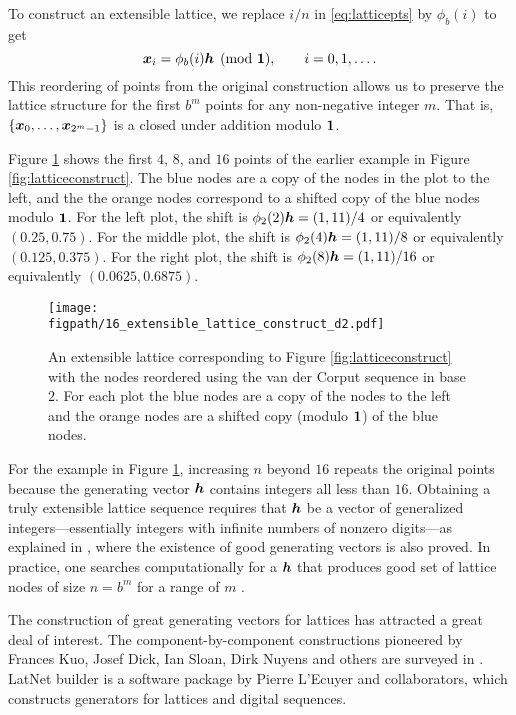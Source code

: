 \documentclass{svproc}
\newcommand{\figpath}{Figures}
\begin{document}
To construct an extensible lattice, we replace $i/n$ in \eqref{eq:latticepts} by $\phi_b(i)$ to get
\begin{equation} \label{eq:extensiblelattice}
	{\boldsymbol{x}}_i =\phi_b( i){\boldsymbol{h}} \pmod {{\boldsymbol{1}}}, \qquad i = 0, 1 , \ldots.
\end{equation}
This reordering of points from the original construction allows us to preserve the lattice structure for the first $b^m$ points for any non-negative integer $m$. That is, $\{{\boldsymbol{x}}_0, \ldots, {\boldsymbol{x}}_{2^m-1}\}$ is a closed under addition modulo ${\boldsymbol{1}}$.

Figure \ref{fig:extensiblelatticeconstruct} shows the first $4$, $8$, and $16$ points of the earlier example in Figure \ref{fig:latticeconstruct}.  The blue nodes are a copy of the nodes in the plot to the left, and the the orange nodes correspond to a shifted copy of the blue nodes modulo ${\boldsymbol{1}}$.  For the left plot, the shift is $\phi_2(2){\boldsymbol{h}} = (1,11)/4$ or equivalently $(0.25,0.75)$.  For the middle plot, the shift is $\phi_2(4){\boldsymbol{h}} = (1,11)/8$ or equivalently $(0.125,0.375)$. For the right plot, the shift is $\phi_2(8){\boldsymbol{h}} = (1,11)/16$  or equivalently $(0.0625,0.6875)$.

\begin{figure}
	\centering
	\texttt{[image: \\figpath/16\_extensible\_lattice\_construct\_d2.pdf]}
	\caption{An extensible lattice corresponding to  Figure \ref{fig:latticeconstruct}  with the nodes reordered using the van der Corput sequence in base $2$.  For each plot the blue nodes are a copy of the nodes to the left and the orange nodes are a shifted copy (modulo ${\boldsymbol{1}}$) of the blue nodes. \label{fig:extensiblelatticeconstruct}}
\end{figure}

For the example in Figure \ref{fig:extensiblelatticeconstruct}, increasing $n$ beyond $16$ repeats the original points because the generating vector ${\boldsymbol{h}}$ contains integers all less than $16$.  Obtaining a truly extensible lattice sequence requires that ${\boldsymbol{h}}$ be a vector of generalized integers---essentially integers with infinite numbers of nonzero digits---as explained in \cite{HicNie03a}, where the existence of good generating vectors is also proved.  In practice, one searches computationally for a ${\boldsymbol{h}}$ that produces good set of lattice nodes of size $n = b^m$ for a range of $m$ \cite{HicEtal00}.

The construction of great generating vectors for lattices has attracted a great deal of interest.  The component-by-component constructions pioneered by Frances Kuo, Josef Dick, Ian Sloan, Dirk Nuyens and others are surveyed in \cite[Chapter ?]{DicEtal22a}.  LatNet builder \cite{LEcEtal22a,LatNet} is a software package by Pierre L'Ecuyer and collaborators, which constructs generators for lattices and digital sequences.
\end{document}
